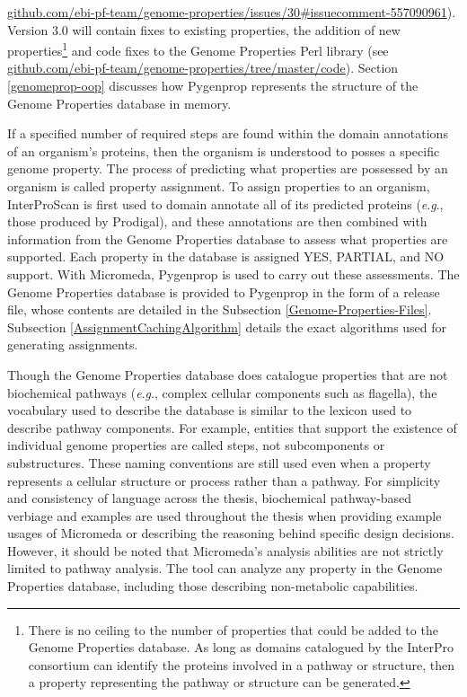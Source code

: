 \href{http://github.com/ebi-pf-team/genome-properties/issues/30#issuecomment-557090961}{github.com/ebi-pf-team/genome-properties/issues/30\#issuecomment-557090961}). 
Version 3.0 will contain fixes to existing properties, the addition of new 
properties\footnote{There is no ceiling to the number of properties that could 
be added to the Genome Properties database. As long as domains catalogued by the 
InterPro consortium can identify the proteins involved in a pathway or 
structure, then a property representing the pathway or structure can be 
generated.} and code fixes to the Genome Properties Perl library (see 
\href{https://github.com/ebi-pf-team/genome-properties/tree/master/code}{github.com/ebi-pf-team/genome-properties/tree/master/code}). 
Section \ref{genomeprop-oop} discusses how Pygenprop represents the structure of 
the Genome Properties database in memory.

If a specified number of required steps are found within the domain annotations 
of an organism's proteins, then the organism is understood to posses a specific 
genome property. The process of predicting what properties are possessed by an 
organism is called property assignment. To assign properties to an organism, 
InterProScan is first used to domain annotate all of its predicted proteins 
(\textit{e}.\textit{g}., those produced by Prodigal), and these annotations are 
then combined with information from the Genome Properties database to assess 
what properties are supported. Each property in the database is assigned YES, 
PARTIAL, and NO support. With Micromeda, Pygenprop is used to carry out these 
assessments. The Genome Properties database is provided to Pygenprop in the form 
of a release file, whose contents are detailed in the Subsection 
\ref{Genome-Properties-Files}. Subsection \ref{AssignmentCachingAlgorithm} 
details the exact algorithms used for generating assignments.

Though the Genome Properties database does catalogue properties that are not 
biochemical pathways (\textit{e}.\textit{g}., complex cellular components such as flagella), the 
vocabulary used to describe the database is similar to the lexicon used to 
describe pathway components. For example, entities that support the existence of 
individual genome properties are called steps, not subcomponents or 
substructures. These naming conventions are still used even when a property 
represents a cellular structure or process rather than a pathway. For simplicity 
and consistency of language across the thesis, biochemical pathway-based 
verbiage and examples are used throughout the thesis when providing example 
usages of Micromeda or describing the reasoning behind specific design 
decisions. However, it should be noted that Micromeda’s analysis abilities are 
not strictly limited to pathway analysis. The tool can analyze any property in 
the Genome Properties database, including those describing non-metabolic 
capabilities.

